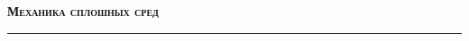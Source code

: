 \documentclass[12pt]{article}
\theoremstyle{example}
\theoremstyle{plain}
\theoremstyle{definition}
\theoremstyle{remark}
\numberwithin{remark}{section}
\begin{document}
	
	\begin{center}
		\Huge \bf	
		\textsc{Механика сплошных сред}
		\rule{\textwidth}{0.4pt}
	\end{center}
	
  
  
  
  
  
  
  

  
  

  
  
  
  

  
  
  
  
  
  

  
  
  
  
  
  
  

  
  
  

  
  
  
  
  
  
  
\end{document}
